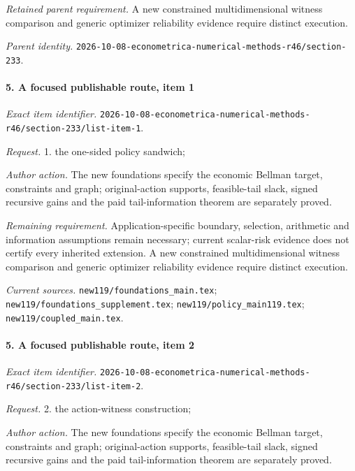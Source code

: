 \par\emph{Retained parent requirement.} A new constrained multidimensional witness comparison and generic optimizer reliability evidence require distinct execution.

\par\emph{Parent identity.} \nolinkurl{2026-10-08-econometrica-numerical-methods-r46/section-233}.

\paragraph{5. A focused publishable route, item 1}

\emph{Exact item identifier.} \nolinkurl{2026-10-08-econometrica-numerical-methods-r46/section-233/list-item-1}.

\par\emph{Request.} 1. the one-sided policy sandwich;

\par\emph{Author action.} The new foundations specify the economic Bellman target, constraints and graph; original-action supports, feasible-tail slack, signed recursive gains and the paid tail-information theorem are separately proved.

\par\emph{Remaining requirement.} Application-specific boundary, selection, arithmetic and information assumptions remain necessary; current scalar-risk evidence does not certify every inherited extension. A new constrained multidimensional witness comparison and generic optimizer reliability evidence require distinct execution.

\par\emph{Current sources.} \nolinkurl{new119/foundations_main.tex}; \nolinkurl{new119/foundations_supplement.tex}; \nolinkurl{new119/policy_main119.tex}; \nolinkurl{new119/coupled_main.tex}.

\paragraph{5. A focused publishable route, item 2}

\emph{Exact item identifier.} \nolinkurl{2026-10-08-econometrica-numerical-methods-r46/section-233/list-item-2}.

\par\emph{Request.} 2. the action-witness construction;

\par\emph{Author action.} The new foundations specify the economic Bellman target, constraints and graph; original-action supports, feasible-tail slack, signed recursive gains and the paid tail-information theorem are separately proved.

